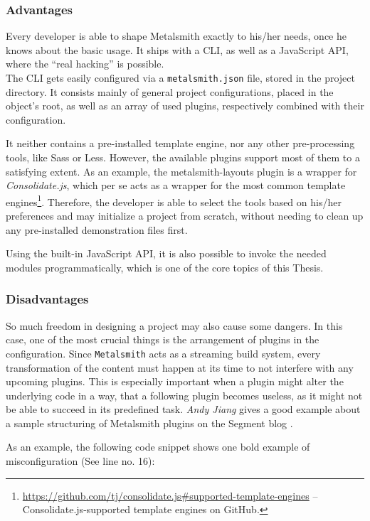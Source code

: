 \subsubsection{Advantages}
Every developer is able to shape Metalsmith exactly to his/her needs, once he knows about the basic usage. It ships with a CLI, as well as a JavaScript API, where the ``real hacking'' is possible.\\
The CLI gets easily configured via a \texttt{metalsmith.json} file, stored in the project directory. It consists mainly of general project configurations, placed in the object's root, as well as an array of used plugins, respectively combined with their configuration.

It neither contains a pre-installed template engine, nor any other pre-processing tools, like Sass or Less. However, the available plugins support most of them to a satisfying extent. As an example, the metalsmith-layouts plugin is a wrapper for \emph{Consolidate.js}, which per se acts as a wrapper for the most common template engines\footnote{\url{https://github.com/tj/consolidate.js\#supported-template-engines} -- Consolidate.js-supported template engines on GitHub.}. Therefore, the developer is able to select the tools based on his/her preferences and may initialize a project from scratch, without needing to clean up any pre-installed demonstration files first.

Using the built-in JavaScript API, it is also possible to invoke the needed modules programmatically, which is one of the core topics of this Thesis.

\subsubsection{Disadvantages}
So much freedom in designing a project may also cause some dangers. In this case, one of the most crucial things is the arrangement of plugins in the configuration. Since \texttt{Metalsmith} acts as a streaming build system, every transformation of the content must happen at its time to not interfere with any upcoming plugins. This is especially important when a plugin might alter the underlying code in a way, that a following plugin becomes useless, as it might not be able to succeed in its predefined task. \emph{Andy Jiang} gives a good example about a sample structuring of Metalsmith plugins on the Segment blog \cite{Metalsmith2015technicaldocumentation}.

As an example, the following code snippet shows one bold example of misconfiguration (See line no. 16):

